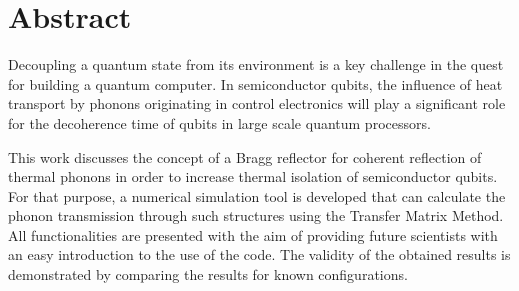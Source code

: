 \chapter*{Abstract}
Decoupling a quantum state from its environment is a key challenge in the quest
for building a quantum computer. 
In semiconductor qubits, the influence of heat transport by phonons 
 originating in control electronics will play a significant role for
the decoherence time of qubits in large scale quantum processors.

This work discusses the concept of a Bragg reflector for coherent
reflection of thermal phonons in order to increase thermal isolation of
semiconductor qubits. For that purpose, a numerical simulation tool is developed
that
can calculate the phonon transmission through such structures using
 the Transfer Matrix Method.
All functionalities are presented with the aim of providing future scientists
with an easy introduction to the use of the code.
The validity of the obtained results is demonstrated by comparing
the results for known configurations.

